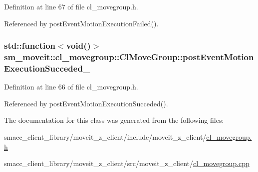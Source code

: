 Definition at line 67 of file cl\+\_\+movegroup.\+h.



Referenced by post\+Event\+Motion\+Execution\+Failed().

\subsubsection[{\texorpdfstring{post\+Event\+Motion\+Execution\+Succeded\+\_\+}{postEventMotionExecutionSucceded_}}]{\setlength{\rightskip}{0pt plus 5cm}std\+::function$<$void()$>$ sm\+\_\+moveit\+::cl\+\_\+movegroup\+::\+Cl\+Move\+Group\+::post\+Event\+Motion\+Execution\+Succeded\+\_\+\hspace{0.3cm}{\ttfamily [private]}}\hypertarget{classsm__moveit_1_1cl__movegroup_1_1ClMoveGroup_aad5217efd0061eb0c6dd70550a53bdd2}{}\label{classsm__moveit_1_1cl__movegroup_1_1ClMoveGroup_aad5217efd0061eb0c6dd70550a53bdd2}


Definition at line 66 of file cl\+\_\+movegroup.\+h.



Referenced by post\+Event\+Motion\+Execution\+Succeded().



The documentation for this class was generated from the following files\+:\begin{DoxyCompactItemize}
\item 
smacc\+\_\+client\+\_\+library/moveit\+\_\+z\+\_\+client/include/moveit\+\_\+z\+\_\+client/\hyperlink{cl__movegroup_8h}{cl\+\_\+movegroup.\+h}\item 
smacc\+\_\+client\+\_\+library/moveit\+\_\+z\+\_\+client/src/moveit\+\_\+z\+\_\+client/\hyperlink{cl__movegroup_8cpp}{cl\+\_\+movegroup.\+cpp}\end{DoxyCompactItemize}

